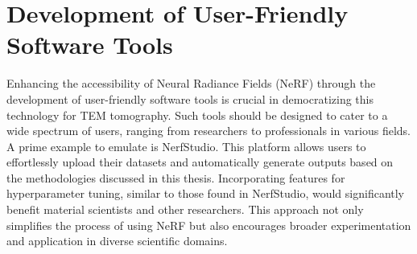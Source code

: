 \section{Development of User-Friendly Software Tools}
Enhancing the accessibility of Neural Radiance Fields (NeRF) through the development of user-friendly software tools is crucial in democratizing this technology for TEM tomography. Such tools should be designed to cater to a wide spectrum of users, ranging from researchers to professionals in various fields. A prime example to emulate is NerfStudio. This platform allows users to effortlessly upload their datasets and automatically generate outputs based on the methodologies discussed in this thesis. Incorporating features for hyperparameter tuning, similar to those found in NerfStudio, would significantly benefit material scientists and other researchers. This approach not only simplifies the process of using NeRF but also encourages broader experimentation and application in diverse scientific domains.
